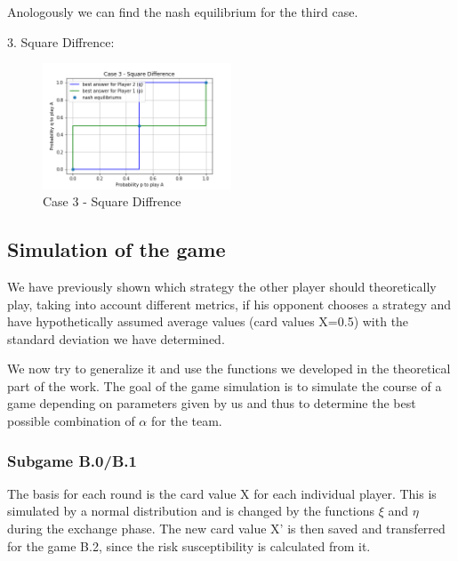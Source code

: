 Anologously we can find the nash equilibrium for the third case.

3. Square Diffrence: \\
\begin{figure}[!ht]
    \centering
    \includegraphics[width=0.5\textwidth]{Bilder/5_diff}
    \caption{Case 3 - Square Diffrence}
    \label{fig:16}
\end{figure}
\subsection{Simulation of the game}
We have previously shown which strategy the other player should theoretically play, taking into account different metrics, if his opponent chooses a strategy and have hypothetically assumed average values (card values X=0.5) with the standard deviation we have determined.

We now try to generalize it and use the functions we developed in the theoretical part of the work. The goal of the game simulation is to simulate the course of a game depending on parameters given by us and thus to determine the best possible combination of $\alpha$ for the team.

\subsubsection{Subgame B.0/B.1}
The basis for each round is the card value X for each individual player. This is simulated by a normal distribution and is changed by the functions $\xi$ and $\eta$ during the exchange phase. The new card value X' is then saved and transferred for the game B.2, since the risk susceptibility is calculated from it.

